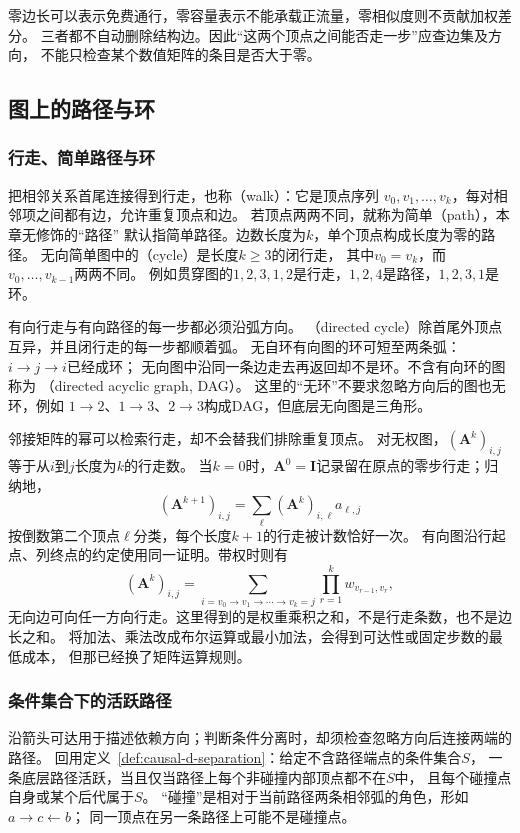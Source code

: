 零边长可以表示免费通行，零容量表示不能承载正流量，零相似度则不贡献加权差分。
三者都不自动删除结构边。因此“这两个顶点之间能否走一步”应查边集及方向，
不能只检查某个数值矩阵的条目是否大于零。

\subsection{图上的路径与环}

\subsubsection{行走、简单路径与环}

把相邻关系首尾连接得到行走，也称（walk）：它是顶点序列
\(v_0,v_1,\ldots,v_k\)，每对相邻项之间都有边，允许重复顶点和边。
若顶点两两不同，就称为简单（path），本章无修饰的“路径”
默认指简单路径。边数长度为\(k\)，单个顶点构成长度为零的路径。
无向简单图中的（cycle）是长度\(k\geq3\)的闭行走，
其中\(v_0=v_k\)，而\(v_0,\ldots,v_{k-1}\)两两不同。
例如贯穿图的\(1,2,3,1,2\)是行走，\(1,2,4\)是路径，\(1,2,3,1\)是环。

有向行走与有向路径的每一步都必须沿弧方向。
（directed cycle）除首尾外顶点互异，并且闭行走的每一步都顺着弧。
无自环有向图的环可短至两条弧：\(i\to j\to i\)已经成环；
无向图中沿同一条边走去再返回却不是环。不含有向环的图称为
（directed acyclic graph, DAG）。
这里的“无环”不要求忽略方向后的图也无环，例如
\(1\to2\)、\(1\to3\)、\(2\to3\)构成DAG，但底层无向图是三角形。

邻接矩阵的幂可以检索行走，却不会替我们排除重复顶点。
对无权图，\((\bm A^k)_{i,j}\)等于从\(i\)到\(j\)长度为\(k\)的行走数。
当\(k=0\)时，\(\bm A^0=\bm I\)记录留在原点的零步行走；归纳地，
\[
  (\bm A^{k+1})_{i,j}=\sum_\ell(\bm A^k)_{i,\ell}a_{\ell,j}
\]
按倒数第二个顶点\(\ell\)分类，每个长度\(k+1\)的行走被计数恰好一次。
有向图沿行起点、列终点的约定使用同一证明。带权时则有
\[
  (\bm A^k)_{i,j}
  =\sum_{i=v_0\to v_1\to\cdots\to v_k=j}
    \prod_{r=1}^{k}w_{v_{r-1},v_r},
\]
无向边可向任一方向行走。这里得到的是权重乘积之和，不是行走条数，也不是边长之和。
将加法、乘法改成布尔运算或最小加法，会得到可达性或固定步数的最低成本，
但那已经换了矩阵运算规则。

\subsubsection{条件集合下的活跃路径}
\label{sec:graph-theory-active-paths}

沿箭头可达用于描述依赖方向；判断条件分离时，却须检查忽略方向后连接两端的路径。
回用定义~\ref{def:causal-d-separation}：给定不含路径端点的条件集合\(S\)，
一条底层路径活跃，当且仅当路径上每个非碰撞内部顶点都不在\(S\)中，
且每个碰撞点自身或某个后代属于\(S\)。
“碰撞”是相对于当前路径两条相邻弧的角色，形如\(a\to c\leftarrow b\)；
同一顶点在另一条路径上可能不是碰撞点。

